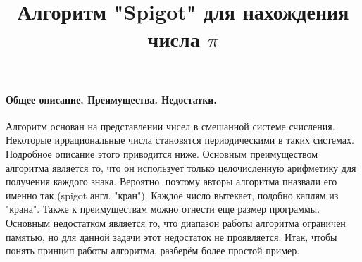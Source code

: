 \documentclass{book}
\title{Алгоритм "Spigot" для нахождения числа $\pi$}
\date{}
\begin{document}
\maketitle
\paragraph{Общее описание. Преимущества. Недостатки.\\}
\begin{normalsize}
Алгоритм основан на представлении чисел в смешанной системе счисления. Некоторые иррациональные числа становятся периодическими в таких системах. Подробное описание этого приводится ниже. Основным преимуществом алгоритма является то, что он использует только целочисленную арифметику для получения каждого знака. Вероятно, поэтому авторы алгоритма пназвали его именно так (spigot англ. "кран"). Каждое число вытекает, подобно каплям из "крана". Также к преимуществам можно отнести еще размер программы. Основным недостатком является то, что диапазон работы алгоритма ограничен памятью, но для данной задачи этот недостаток не проявляется. Итак, чтобы понять принцип работы алгоритма, разберём более простой пример.
\end{normalsize}
\end{document}
